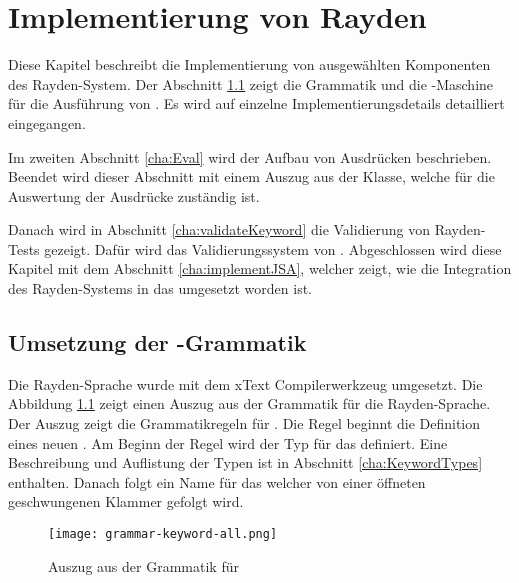 \chapter{Implementierung von Rayden}
\label{cha:Implementierung}

Diese Kapitel beschreibt die Implementierung von ausgewählten Komponenten des Rayden-System. Der Abschnitt \ref{cha:KeywordGrammar} zeigt die Grammatik und die -Maschine für die Ausführung von . Es wird auf einzelne Implementierungsdetails detailliert eingegangen.  

\SuperPar
Im zweiten Abschnitt \ref{cha:Eval} wird der Aufbau von Ausdrücken beschrieben. Beendet wird dieser Abschnitt mit einem Auszug aus der  Klasse, welche für die Auswertung der Ausdrücke zuständig ist. 

\SuperPar
Danach wird in Abschnitt \ref{cha:validateKeyword} die Validierung von Rayden-Tests gezeigt. Dafür wird das Validierungssystem von . Abgeschlossen wird diese Kapitel mit dem Abschnitt \ref{cha:implementJSA}, welcher zeigt, wie die Integration des Rayden-Systems in das  umgesetzt worden ist. 


\section{Umsetzung der -Grammatik}
\label{cha:KeywordGrammar}

Die Rayden-Sprache wurde mit dem xText \cite{xtext} Compilerwerkzeug umgesetzt. Die Abbildung \ref{fig:keywordGrammar} zeigt einen Auszug aus der Grammatik für die Rayden-Sprache. Der Auszug zeigt die Grammatikregeln für . Die Regel  beginnt die Definition eines neuen . Am Beginn der Regel wird der Typ für das  definiert. Eine Beschreibung und Auflistung der Typen ist in Abschnitt \ref{cha:KeywordTypes} enthalten. Danach folgt ein Name für das  welcher von einer öffneten geschwungenen Klammer gefolgt wird.

\begin{figure}
\centering
\texttt{[image: grammar-keyword-all.png]}
\caption{Auszug aus der Grammatik für }
\label{fig:keywordGrammar}
\end{figure}

